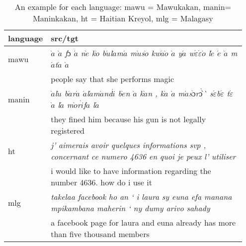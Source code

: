 
\begin{table*}
	\setlength{\tabcolsep}{4.5pt}
	\begin{tabular}{p{0.1\linewidth}p{0.85\linewidth}}
	\toprule
	language & src/tgt \\
	\toprule
	mawu & \emph{$\grave{a}$ $\grave{a}$ f$\acute{ɔ}$ $\acute{a}$ n$\grave{e}$ k$\grave{o}$ b$\acute{u}$l$\grave{a}$m$\acute{a}$ m$\grave{u}$s$\grave{o}$ kw$\acute{a}$$\grave{o}$ $\grave{a}$ y$\acute{a}$ w$\acute{\varepsilon}$$\acute{\varepsilon}$$\acute{o}$ l$\acute{e}$ $\acute{e}$ $\grave{a}$ m$\acute{a}$t$\acute{a}$
	$\grave{a}$} \\
	 & people say that she performs magic\\
	\midrule
	manin & \emph{$\grave{a}$l$\grave{u}$  b$\acute{a}$r$\acute{a}$ $\acute{a}$l$\acute{a}$m$\acute{a}$nd$\acute{i}$ b$\grave{e}$n $\grave{a}$ k$\grave{a}$n , k$\grave{a}$ $\grave{a}$ m$\acute{a}$s$\grave{ɔ}$r$\grave{ɔ̀}$̀  s$\acute{\varepsilon}$b$\acute{\varepsilon}$ t$\acute{\varepsilon}$ $\grave{a}$ l$\acute{a}$ 
	m$\grave{o}$r$\grave{i}$f$\grave{a}$ l$\acute{a}$} \\

	  & they fined him because his gun is not legally registered\\
	\midrule
	ht & \emph{j' aimerais avoir quelques informations svp , concernant ce numero 4636 en quoi je peux l' utiliser} \\
	&	 i would like to have information regarding the number 4636. how do i use it\\
	\midrule
	mlg & \emph{takelaa facebook ho an ` i laura sy euna efa manana mpikambana maherin  ` ny dumy arivo sahady} \\
	 & a facebook page for laura and euna already has more than five thousand members\\
	\bottomrule
	\end{tabular}
	\caption{An example for each language: mawu = Mawukakan, manin= Maninkakan, ht = Haitian Kreyol, mlg = Malagasy}
	\label{table:example_each}
\end{table*}
		
